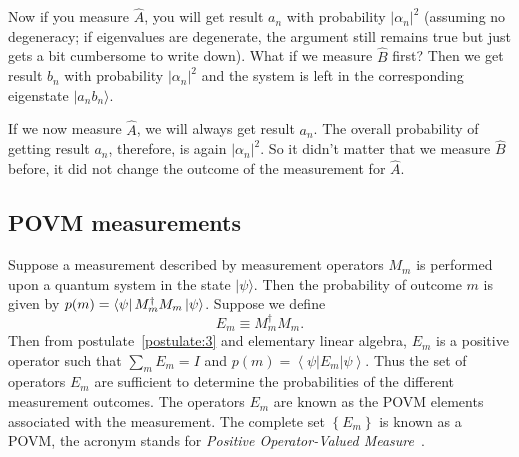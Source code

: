Now if you measure $\hat A$, you will get result $a_n$ with probability $|\alpha_n|^2$ (assuming no degeneracy; if eigenvalues are degenerate, the argument still remains true but just gets a bit cumbersome to write down). What if we measure $\hat B$ first? Then we get result $b_n$ with probability $|\alpha_n|^2$ and the system is left in the corresponding eigenstate $|a_n b_n \rangle$. 

If we now measure $\hat A$, we will always get result $a_n$. The overall probability of getting result $a_n$, therefore, is again $|\alpha_n|^2$. So it didn't matter that we measure $\hat B$ before, it did not change the outcome of the measurement for $\hat A$.

\subsection{POVM measurements}
Suppose a measurement described by measurement operators $M_{m}$ is performed upon a quantum system in the state $|\psi\rangle$. Then the probability of outcome $m$ is given by $p(m)=\bra{\psi}M_{m}^{\dagger} M_{m}\ket{\psi}$. Suppose we define
\begin{equation}
E_{m} \equiv M_{m}^{\dagger} M_{m}.
\end{equation}
Then from postulate~\ref{postulate:3} and elementary linear algebra, $E_{m}$ is a positive operator such that $\sum_{m} E_{m}=I$ and $p(m)=\left\langle\psi\left|E_{m}\right| \psi\right\rangle$. Thus the set of operators $E_{m}$ are sufficient to determine the probabilities of the different measurement outcomes. The operators $E_{m}$ are known as the POVM elements associated with the measurement. The complete set $\left\{E_{m}\right\}$ is known as a POVM, the acronym stands for \emph{Positive Operator-Valued Measure}~\cite{NielsenChuang}.
